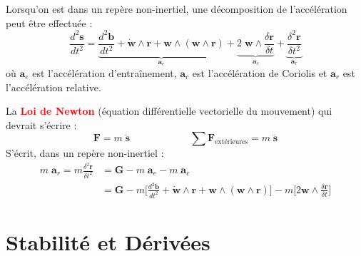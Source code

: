 \documentclass[a4paper]{article}
\begin{document}
Lorsqu'on est dans un repère non-inertiel, une décomposition de l'accélération peut être effectuée : 
\[ \frac{d^2 \textbf{s}}{d t^2} = \underbrace{ \frac{d^2 \textbf{b}}{d t^2} + \dot{\textbf{w}} \wedge \textbf{r} + \textbf{w} \wedge (\textbf{w} \wedge \textbf{r}) }_{\textbf{a}_e} + \underbrace{ 2 \; \textbf{w} \wedge \frac{\delta \textbf{r}}{\delta t} }_{\textbf{a}_c} + \underbrace{ \frac{\delta^2 \textbf{r}}{\delta t^2} }_{\textbf{a}_r} \]
où $ \textbf{a}_e $ est l'accélération d'entraînement, $ \textbf{a}_c $ est l'accélération de Coriolis et $ \textbf{a}_r $ est l'accélération relative.

La \textcolor{red}{\textbf{Loi de Newton}} (équation différentielle vectorielle du mouvement) qui devrait s'écrire : 
\[ \textbf{F} = m \; \ddot{\textbf{s}} \qquad \qquad \qquad \sum \textbf{F}_{\text{extérieures}} = m \; \ddot{\textbf{s}} \]
S'écrit, dans un repère non-inertiel : 
\[ \begin{aligned} m \; \textbf{a}_r = m \frac{\delta^2 \textbf{r}}{\delta t^2} &= \textbf{G} - m \; \textbf{a}_e - m \; \textbf{a}_c \\ &= \textbf{G} - m \Big[ \frac{d^2 \textbf{b}}{d t^2} + \dot{\textbf{w}} \wedge \textbf{r} + \textbf{w} \wedge (\textbf{w} \wedge \textbf{r}) \Big] - m \Big[ 2 \textbf{w} \wedge \frac{\delta \textbf{r}}{\delta t} \Big] \end{aligned} \]










\section{Stabilité et Dérivées}
\end{document}
